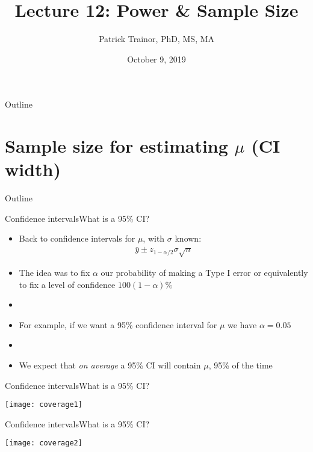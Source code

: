 \documentclass[xcolor=dvipsnames]{beamer}
\title[Lecture 12]{Lecture 12: Power \& Sample Size}
\author[Patrick Trainor]{Patrick Trainor, PhD, MS, MA}
\institute[NMSU]{New Mexico State University}
\date{October 9, 2019}
\begin{document}
\begin{frame}
\maketitle
\end{frame}

\begin{frame}{Outline}
\tableofcontents[hideallsubsections]
\end{frame}

\section{Sample size for estimating $\mu$ (CI width)}

\begin{frame}{Outline}
\tableofcontents[currentsection,subsectionstyle=show/shaded/hide]
\end{frame}

\begin{frame}{Confidence intervals}{What is a 95\% CI?}
\begin{itemize}
	\item Back to confidence intervals for $\mu$, with $\sigma$ known:
	\begin{gather*}
		\bar{y}\pm z_{1-\alpha/2} \sigma \sqrt{n}
	\end{gather*}
	\item The idea was to fix $\alpha$ our probability of making a Type I error or equivalently to fix a level of confidence $100(1-\alpha)\%$
	\item[]
	\item For example, if we want a 95\% confidence interval for $\mu$ we have $\alpha = 0.05$
	\item[]
	\item We expect that \emph{on average} a 95\% CI will contain $\mu$,  95\% of the time
\end{itemize}
\end{frame}

\begin{frame}{Confidence intervals}{What is a 95\% CI?}
	\begin{center}
		\texttt{[image: coverage1]}
	\end{center}
\end{frame}

\begin{frame}{Confidence intervals}{What is a 95\% CI?}
\begin{center}
	\texttt{[image: coverage2]}
\end{center}
\end{frame}
\end{document}
